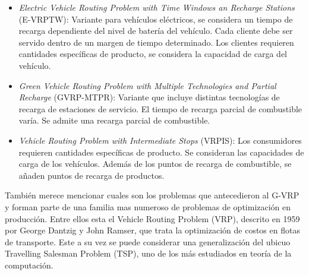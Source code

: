 \documentclass[letter, 10pt]{article}
\begin{document}
 \begin{itemize}
     \item \textit{Electric Vehicle Routing Problem with Time Windows an Recharge Stations} (E-VRPTW): Variante para vehículos eléctricos, se considera un tiempo de recarga dependiente del nivel de batería del vehículo. Cada cliente debe ser servido dentro de un margen de tiempo determinado. Los clientes requieren cantidades específicas de producto, se considera la capacidad de carga del vehículo.~\cite{Electric}
     \item \textit{Green Vehicle Routing Problem with Multiple Technologies and Partial Recharge} (GVRP-MTPR): Variante que incluye distintas tecnologías de recarga de estaciones de servicio. El tiempo de recarga parcial de combustible varía. Se admite una recarga parcial de combustible. ~\cite{felipe_heuristic_2014}
     \item \textit{Vehicle Routing Problem with Intermediate Stops} (VRPIS): Los consumidores requieren cantidades específicas de producto. Se consideran las capacidades de carga de los vehículos. Además de los puntos de recarga de combustible, se añaden puntos de recarga de productos.~\cite{Intermediate}
 \end{itemize}
También merece mencionar cuales son los problemas que antecedieron al G-VRP y forman parte de una familia mas numeroso de problemas de optimización en producción. Entre ellos esta el Vehicle Routing Problem (VRP), descrito en 1959 por George Dantzig y John Ramser, que trata la optimización de costos en flotas de transporte. Este a su vez se puede considerar una generalización del ubicuo Travelling Salesman Problem (TSP), uno de los más estudiados en teoría de la computación. 
\end{document}
